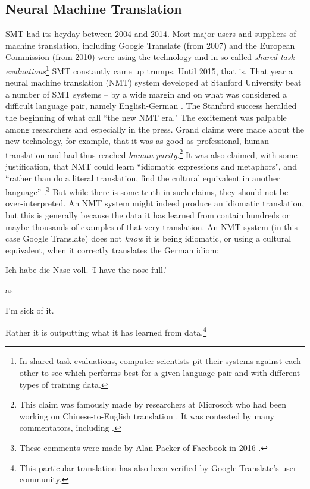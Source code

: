 \documentclass[output=paper]{langscibook}
\begin{document}
\subsection{Neural Machine Translation}
SMT had its heyday between 2004 and 2014. Most major users and suppliers of machine translation, including Google Translate (from 2007) and the European Commission (from 2010) were using the technology and in so-called \textit{shared task evaluations}\footnote{In shared task evaluations, computer scientists pit their systems against each other to see which performs best for a given language-pair and with different types of training data.} SMT constantly came up trumps. Until 2015, that is. That year a neural machine translation (NMT) system developed at Stanford University beat a number of SMT systems -- by a wide margin and on what was considered a difficult language pair, namely English-German \citep{Bentivogli2016}. The Stanford success heralded the beginning of what \citet{Bentivogli2016} call “the new NMT era." The excitement was palpable among researchers and especially in the press. Grand claims were made about the new technology, for example, that it was as good as professional, human translation and had thus reached \textit{human parity}.\footnote{This claim was famously made by researchers at Microsoft who had been working on Chinese-to-English translation \citep{Marking2016}. It was contested by many commentators, including \citet{Toral-etal-2018}.} It was also claimed, with some justification, that NMT could learn “idiomatic expressions and metaphors", and “rather than do a literal translation, find the cultural equivalent in another language” \citep{Marking2016}.\footnote{These comments were made by Alan Packer of Facebook in 2016 \citep{Marking2016}.} But while there is some truth in such claims, they should not be over-interpreted. An NMT system might indeed produce an idiomatic translation, but this is generally  because the data it has learned from contain hundreds or maybe thousands of examples of that very translation. An NMT system (in this case Google Translate) does not \textit{know} it is being idiomatic, or using a cultural equivalent, when it correctly translates the German idiom:

\ea
Ich habe die Nase voll.
\glt ‘I have the nose full.'
\z

\noindent as

\ea
I'm sick of it.
\z

Rather it is outputting what it has learned from data.\footnote{This particular translation has also been verified by Google Translate's user community.}
\end{document}
